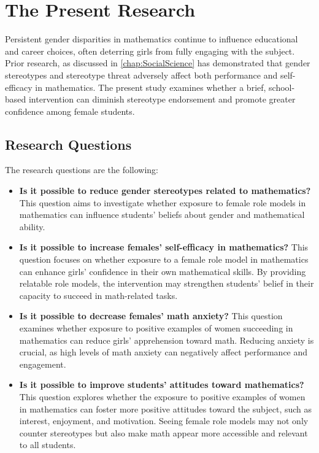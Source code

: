 \chapter{The Present Research}\label{chap:dolor}
Persistent gender disparities in mathematics continue to influence educational and career choices, often deterring girls from fully engaging with the subject. Prior research, as discussed in \ref{chap:SocialScience} has demonstrated that gender stereotypes and stereotype threat adversely affect both performance and self-efficacy in mathematics. The present study examines whether a brief, school-based intervention can diminish stereotype endorsement and promote greater confidence among female students.

\section{Research Questions}
The research questions are the following:
\begin{itemize}
    \item[RQ1.] \textbf{Is it possible to reduce gender stereotypes related to mathematics?} This question aims to investigate whether exposure to female role models in mathematics can influence students’ beliefs about gender and mathematical ability.
    \item[RQ2.] \textbf{Is it possible to increase females’ self-efficacy in mathematics?} This question focuses on whether exposure to a female role model in mathematics can enhance girls’ confidence in their own mathematical skills. By providing relatable role models, the intervention may strengthen students’ belief in their capacity to succeed in math-related tasks.
    \item[RQ3.] \textbf{Is it possible to decrease females' math anxiety?} This question examines whether exposure to positive examples of women succeeding in mathematics can reduce girls’ apprehension toward math. Reducing anxiety is crucial, as high levels of math anxiety can negatively affect performance and engagement.
    \item[RQ4.] \textbf{Is it possible to improve students’ attitudes toward mathematics?} This question explores whether the exposure to positive examples of women in mathematics can foster more positive attitudes toward the subject, such as interest, enjoyment, and motivation. Seeing female role models may not only counter stereotypes but also make math appear more accessible and relevant to all students.
\end{itemize}

